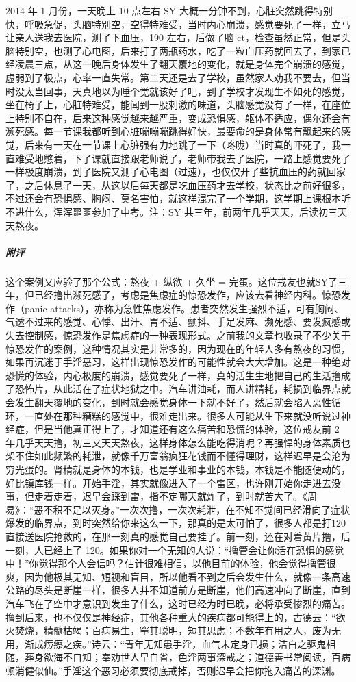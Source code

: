 \begin{case}
    2014 年 1 月份，一天晚上 10 点左右 SY 大概一分钟不到，心脏突然跳得特别快，呼吸急促，头脑特别空，空得特难受，当时内心崩溃，感觉要死了一样，立马让亲人送我去医院，测了下血压，190 左右，后做了脑 ct，检查虽然正常，但是头脑特别空，也测了心电图，后来打了两瓶药水，吃了一粒血压药就回去了，到家已经凌晨三点，从这一晚后身体发生了翻天覆地的变化，就是身体完全崩溃的感觉，虚弱到了极点，心率一直失常。第二天还是去了学校，虽然家人劝我不要去，但当时没太当回事，天真地以为睡个觉就该好了吧，到了学校才发现生不如死的感觉，坐在椅子上，心脏特难受，能闻到一股刺激的味道，头脑感觉没有了一样，在座位上特别不自在，后来这种感觉越来越严重，变成恐惧感，躯体不适应，偶尔还会有濒死感。每一节课我都听到心脏嘣嘣嘣跳得好快，最要命的是身体常有飘起来的感觉，后来有一天在一节课上心脏强有力地跳了一下（咚咙）当时真的吓死了，我一直难受地憋着，下了课就直接跟老师说了，老师带我去了医院，一路上感觉要死了一样极度崩溃，到了医院又测了心电图（过速），也仅仅开了些抗血压的药就回家了，之后休息了一天，从这以后每天都是吃血压药才去学校，状态比之前好很多，不过还会有恐惧感、胸闷、莫名害怕，就这样混完了一个学期，这学期上课根本听不进什么，浑浑噩噩参加了中考。注：SY 共三年，前两年几乎天天，后读初三天天熬夜。
    \subparagraph{附评} 这个案例又应验了那个公式：熬夜 + 纵欲 + 久坐 = 完蛋。这位戒友也就SY了三年，但已经撸出濒死感了，考虑是焦虑症的惊恐发作，应该去看神经内科。惊恐发作（panic attacks），亦称为急性焦虑发作。患者突然发生强烈不适，可有胸闷、气透不过来的感觉、心悸、出汗、胃不适、颤抖、手足发麻、濒死感、要发疯感或失去控制感，惊恐发作是焦虑症的一种表现形式。之前我的文章也收录了不少关于惊恐发作的案例，这种情况其实是非常多的，因为现在的年轻人多有熬夜的习惯，如果再沉迷于手淫恶习，这样出现惊恐发作的可能性就会大大增加。这是一种绝对恐慌的体验，内心极度的崩溃，感觉要死了一样，真的活生生地把自己的生活撸成了恐怖片，从此活在了症状地狱之中。汽车讲油耗，而人讲精耗，耗损到临界点就会发生翻天覆地的变化，到时就会感觉身体一下就不好了，然后就会陷入恶性循环，一直处在那种糟糕的感觉中，很难走出来。很多人可能从生下来就没听说过神经症，但是当他真正得上了，才知道还有这么痛苦和恐慌的体验，这位戒友前 2 年几乎天天撸，初三又天天熬夜，这样身体怎么能吃得消呢？再强悍的身体素质也架不住如此频繁的耗泄，就像千万富翁疯狂花钱而不懂得理财，这样迟早是会沦为穷光蛋的。肾精就是身体的本钱，也是学业和事业的本钱，本钱是不能随便动的，好比镇库钱一样。开始手淫，其实就像进入了一个雷区，也许刚开始你走进去没事，但走着走着，迟早会踩到雷，指不定哪天就炸了，到时就苦大了。《周易》：“恶不积不足以灭身。”一次次撸，一次次耗泄，在不知不觉间已经滑向了症状爆发的临界点，到时突然给你来这么一下，那真的是太可怕了，很多人都是打120直接送医院抢救的，在那一刻真的感觉自己要挂了。前一刻，还在对着黄片撸，后一刻，人已经上了 120。如果你对一个无知的人说：“撸管会让你活在恐惧的感觉中！”你觉得那个人会信吗？估计很难相信，以他目前的体验，他会觉得撸管很爽，因为他极其无知、短视和盲目，所以他看不到之后会发生什么，就像一条高速公路的尽头是断崖一样，很多人并不知道前方是断崖，他们高速冲向了断崖，直到汽车飞在了空中才意识到发生了什么，这时已经为时已晚，必将承受惨烈的痛苦。撸到后来，也不仅仅是神经症，其他各种重大的疾病都可能得上的，古德云：“欲火焚烧，精髓枯竭；百病易生，窒其聪明，短其思虑；不数年有用之人，废为无用，渐成痨瘵之疾。”诗云：“青年无知患手淫，血气未定身已损；洁白之驱鬼相随，葬身欲海不自知；奉劝世人早自省，色淫两事深戒之；道德善书常阅读，百病顿消健似仙。”手淫这个恶习必须要彻底戒掉，否则迟早会把你拖入痛苦的深渊。

\end{case}
